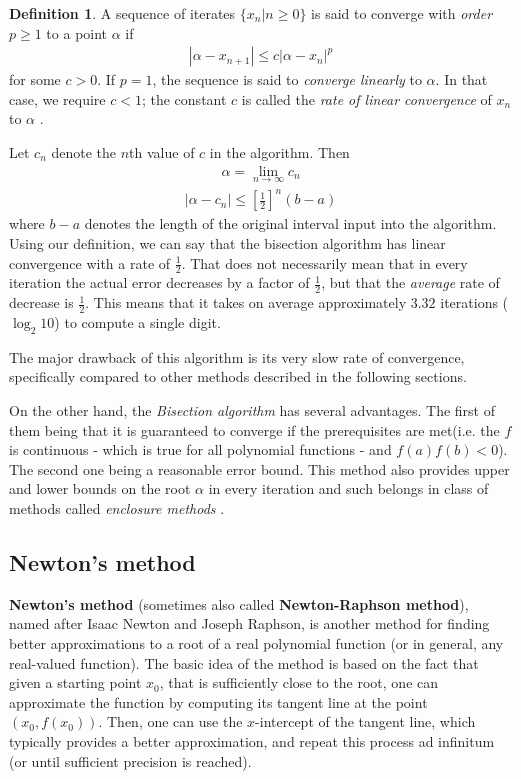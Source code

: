 \documentclass[
  digital, %
  table,   %
  nolof,     %
  nolot,     %
	draft, %
]{fithesis3}
\begin{document}
\theoremstyle{definition}
\newtheorem{definition}{Definition}

\begin{definition}
  A sequence of iterates $\{ x_{n} | n \geq 0\}$ is said to converge with \textit{order $p \geq 1$} to a point $\alpha$ if
	\begin{align}
      |\alpha - x_{n + 1}| \leq c |\alpha - x_{n}|^{p}  \tag*{$n \geq 0$} 
	\end{align}
	for some $c > 0$. If $p = 1$, the sequence is said to \textit{converge linearly} to $\alpha$. In that case, we require $c < 1$; the constant $c$ is called the \textit{rate of linear convergence} of $x_{n}$ to $\alpha$ \parencite[p.~56]{rootApproxMeth}.
	\label{def:converg}
\end{definition}
Let $c_{n}$ denote the $n$th value of $c$ in the algorithm. Then 
\begin{align}
      \alpha = \lim_{n\to\infty} c_{n}
\end{align}
\begin{align}
      |\alpha - c_{n}| \leq \left[\frac{1}{2}\right]^n (b - a)
\end{align}
where $b - a$ denotes the length of the original interval input into the algorithm. Using our definition, we can say that the bisection algorithm has linear convergence with a rate of $\frac{1}{2}$. That does not necessarily mean that in every iteration the actual error decreases by a factor of $\frac{1}{2}$, but that the \textit{average} rate of decrease is $\frac{1}{2}$. This means that it takes on average approximately $3.32$ iterations ($\log_2 10$) to compute a single digit.

The major drawback of this algorithm is its very slow rate of convergence, specifically compared to other methods described in the following sections.

On the other hand, the \textit{Bisection algorithm} has several advantages. The first of them being that it is guaranteed to converge if the prerequisites are met(i.e. the $f$ is continuous - which is true for all polynomial functions - and $f(a)f(b) < 0$). The second one being a reasonable error bound. This method also provides upper and lower bounds on the root $\alpha$ in every iteration and such belongs in class of methods called \textit{enclosure methods} \parencite{rootApproxMeth}.


\subsection{Newton's method}
\textbf{Newton's method} (sometimes also called \textbf{Newton-Raphson method}), named after Isaac Newton and Joseph Raphson, is another method for finding better approximations to a root of a real polynomial function (or in general, any real-valued function). The basic idea of the method is based on the fact that given a starting point $x_{0}$, that is sufficiently close to the root, one can approximate the function by computing its tangent line at the point $(x_{0}, f(x_{0}))$. Then, one can use the $x$-intercept of the tangent line, which typically provides a better approximation, and repeat this process ad infinitum \parencite{rootApproxMeth} (or until sufficient precision is reached). 
\end{document}

